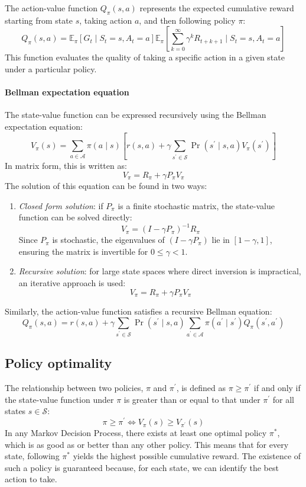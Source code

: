 The action-value function $Q_{\pi}(s,a)$ represents the expected cumulative reward starting from state $s$, taking action $a$, and then following policy $\pi$:
\[Q_{\pi}(s,a)=\mathbb{E}_{\pi}\left[G_t\mid S_t=s,A_t=a\right]\mathbb{E}_{\pi}\left[\sum_{k=0}^{\infty}\gamma^kR_{t+k+1}\mid S_t=s,A_t=a\right]\]
This function evaluates the quality of taking a specific action in a given state under a particular policy.

\paragraph*{Bellman expectation equation}
The state-value function can be expressed recursively using the Bellman expectation equation:
\[V_{\pi}(s) = \sum_{a\in\mathcal{A}}\pi(a\mid s)\left[r(s,a)+\gamma\sum_{s^\prime\in\mathcal{S}}\Pr(s^\prime\mid s,a)V_{\pi}(s^\prime)\right]\]
In matrix form, this is written as:
\[V_\pi=R_\pi+\gamma P_\pi V_\pi\]
The solution of this equation can be found in two ways: 
\begin{enumerate}
    \item \textit{Closed form solution}: if $P_\pi$ is a finite stochastic matrix, the state-value function can be solved directly:
        \[V_\pi=(I-\gamma P_\pi)^{-1}R_\pi\]
        Since $P_\pi$ is stochastic, the eigenvalues of $(I-\gamma P_\pi)$ lie in $[1 - \gamma, 1]$, ensuring the matrix is invertible for $0 \leq \gamma <1$. 
    \item \textit{Recursive solution}: for large state spaces where direct inversion is impractical, an iterative approach is used:
        \[V_\pi=R_\pi+\gamma P_\pi V_\pi\]
\end{enumerate}
Similarly, the action-value function satisfies a recursive Bellman equation:
\[ Q_{\pi}(s,a)= r(s,a) + \gamma \sum_{s^\prime \in \mathcal{S}} \Pr(s^\prime \mid s, a) \sum_{a^\prime \in \mathcal{A}} \pi(a^\prime \mid s^\prime) Q_{\pi}(s^\prime, a^\prime)\]

\subsection{Policy optimality}
The relationship between two policies, $\pi$ and $\pi^\prime$, is defined as $\pi\geq\pi^\prime$ if and only if the state-value function under $\pi$ is greater than or equal to that under $\pi^\prime$ for all states $s \in \mathcal{S}$: 
\[\pi\geq\pi^\prime \iff V_\pi(s)\geq V_{\pi^\prime}(s)\]
\noindent In any Markov Decision Process, there exists at least one optimal policy $\pi^\ast$, which is as good as or better than any other policy.
This means that for every state, following $\pi^\ast$ yields the highest possible cumulative reward.
The existence of such a policy is guaranteed because, for each state, we can identify the best action to take.

